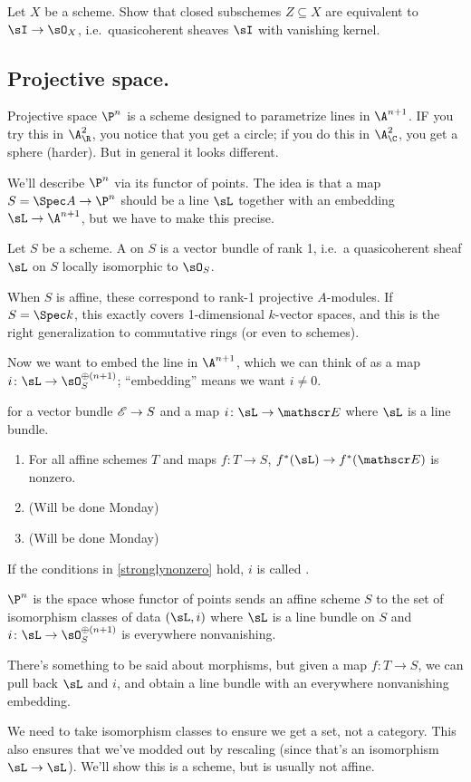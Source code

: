 \begin{ex}
Let $X$ be a scheme. Show that closed subschemes $Z\subseteq X$ are equivalent to 
$\sI\to\sO_X$, i.e.\ quasicoherent sheaves $\sI$ with vanishing kernel.
\end{ex}
\subsection*{Projective space.}
Projective space $\P^n$ is a scheme designed to parametrize lines in $\A^{n+1}$. IF you try this in $\A_\R^2$, you
notice that you get a circle; if you do this in $\A_\C^2$, you get a sphere (harder). But in general it looks
different.

We'll describe $\P^n$ via its functor of points. The idea is that a map $S = \Spec A\to\P^n$ should be a line $\sL$
together with an embedding $\sL\to\A^{n+1}$, but we have to make this precise.
\begin{defn}
Let $S$ be a scheme. A  on $S$ is a vector bundle of rank 1, i.e.\ a quasicoherent sheaf $\sL$ on
$S$ locally isomorphic to $\sO_S$.
\end{defn}
When $S$ is affine, these correspond to rank-1 projective $A$-modules. If $S = \Spec k$, this exactly covers
1-dimensional $k$-vector spaces, and this is the right generalization to commutative rings (or even to schemes).

Now we want to embed the line in $\A^{n+1}$, which we can think of as a map $i\colon\sL\to\sO_S^{\oplus (n+1)}$;
``embedding'' means we want $i\ne 0$.
\begin{prop}
\label{stronglynonzero}
\TFAE{} for a vector bundle $\mathscr E\to S$ and a map $i\colon\sL\to\sE$ where $\sL$ is a line bundle.
\begin{enumerate}
	\item For all affine schemes $T$ and maps $f\colon T\to S$, $f^*(\sL)\to f^*(\sE)$ is nonzero.
	\item (Will be done Monday)
	\item (Will be done Monday)
\end{enumerate}
\end{prop}
\begin{defn}
If the conditions in \cref{stronglynonzero} hold, $i$ is called .
\end{defn}
\begin{defn}
 $\P^n$ is the space whose functor of points sends an affine scheme $S$ to the set of
isomorphism classes of data $(\sL,i)$ where $\sL$ is a line bundle on $S$ and $i\colon\sL\to\sO_S^{\oplus(n+1)}$ is
everywhere nonvanishing.
\end{defn}
There's something to be said about morphisms, but given a map $f\colon T\to S$, we can pull back $\sL$ and $i$, and
obtain a line bundle with an everywhere nonvanishing embedding.

We need to take isomorphism classes to ensure we get a set, not a category. This also ensures that we've modded out
by rescaling (since that's an isomorphism $\sL\to\sL$). We'll show this is a scheme, but is usually not affine.
